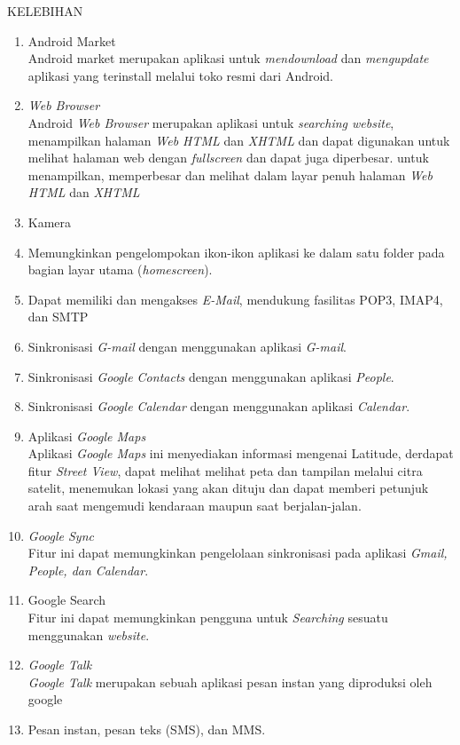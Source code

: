 \begin{enumerate}
KELEBIHAN
\begin{enumerate}

\item Android Market\\ 
Android market merupakan aplikasi untuk \textit{mendownload} dan \textit{mengupdate} aplikasi yang terinstall melalui toko resmi dari Android.
\item \textit{Web Browser}\\
Android \textit{Web Browser} merupakan aplikasi untuk \textit{searching website}, menampilkan halaman \textit{Web HTML} dan \textit{XHTML} dan dapat digunakan untuk melihat halaman web dengan \textit{fullscreen} dan dapat juga diperbesar.
untuk menampilkan, memperbesar dan melihat dalam layar penuh halaman \textit{Web HTML} dan \textit{XHTML}
\item Kamera
\item Memungkinkan pengelompokan ikon-ikon aplikasi ke dalam satu folder pada bagian layar utama (\textit{homescreen}).
\item Dapat memiliki dan mengakses \textit{E-Mail}, mendukung fasilitas POP3, IMAP4, dan SMTP
\item Sinkronisasi \textit{G-mail} dengan menggunakan aplikasi \textit{G-mail}.
\item Sinkronisasi \textit{Google Contacts} dengan menggunakan aplikasi \textit{People}.
\item Sinkronisasi \textit{Google Calendar} dengan menggunakan aplikasi \textit{Calendar}.
\item Aplikasi \textit{Google Maps} \\
Aplikasi \textit{Google Maps} ini menyediakan informasi mengenai Latitude, derdapat fitur \textit{Street View}, dapat melihat melihat peta dan tampilan melalui citra satelit, menemukan lokasi yang akan dituju dan dapat memberi petunjuk arah saat mengemudi kendaraan maupun saat berjalan-jalan.
\item \textit{Google Sync}\\ 
Fitur ini dapat memungkinkan pengelolaan sinkronisasi pada aplikasi \textit{Gmail, People, dan Calendar}.
\item Google Search\\
Fitur ini dapat memungkinkan pengguna untuk \textit{Searching} sesuatu menggunakan \textit{website}.
\item \textit{Google Talk} \\
\textit{Google Talk} merupakan sebuah aplikasi pesan instan yang diproduksi oleh google
\item Pesan instan, pesan teks (SMS), dan MMS.

\end{enumerate}
\end{enumerate}
